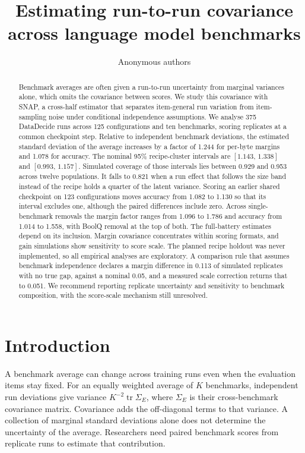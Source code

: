 \documentclass{article}
\title{Estimating run-to-run covariance\\across language model benchmarks}
\author{Anonymous authors}
\newcommand{\ci}[2]{\ensuremath{[#1,\,#2]}}
\newcommand{\Sig}{\Sigma_E}
\begin{document}
\maketitle
\begin{abstract}
Benchmark averages are often given a run-to-run uncertainty from marginal variances alone, which omits the covariance between scores. We study this covariance with SNAP, a cross-half estimator that separates item-general run variation from item-sampling noise under conditional independence assumptions. We analyse 375 DataDecide runs across 125 configurations and ten benchmarks, scoring replicates at a common checkpoint step. Relative to independent benchmark deviations, the estimated standard deviation of the average increases by a factor of 1.244 for per-byte margins and 1.078 for accuracy. The nominal 95\% recipe-cluster intervals are \ci{1.143}{1.338} and \ci{0.993}{1.157}. Simulated coverage of those intervals lies between 0.929 and 0.953 across twelve populations. It falls to 0.821 when a run effect that follows the size band instead of the recipe holds a quarter of the latent variance. Scoring an earlier shared checkpoint on 123 configurations moves accuracy from 1.082 to 1.130 so that its interval excludes one, although the paired differences include zero. Across single-benchmark removals the margin factor ranges from 1.096 to 1.786 and accuracy from 1.014 to 1.558, with BoolQ removal at the top of both. The full-battery estimates depend on its inclusion. Margin covariance concentrates within scoring formats, and gain simulations show sensitivity to score scale. The planned recipe holdout was never implemented, so all empirical analyses are exploratory. A comparison rule that assumes benchmark independence declares a margin difference in 0.113 of simulated replicates with no true gap, against a nominal 0.05, and a measured scale correction returns that to 0.051. We recommend reporting replicate uncertainty and sensitivity to benchmark composition, with the score-scale mechanism still unresolved.
\end{abstract}

\section{Introduction}
A benchmark average can change across training runs even when the evaluation items stay fixed. For an equally weighted average of $K$ benchmarks, independent run deviations give variance $K^{-2}\operatorname{tr}\Sig$, where $\Sig$ is their cross-benchmark covariance matrix. Covariance adds the off-diagonal terms to that variance. A collection of marginal standard deviations alone does not determine the uncertainty of the average. Researchers need paired benchmark scores from replicate runs to estimate that contribution.
\end{document}
